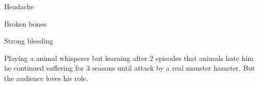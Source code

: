 \begin{npcBox}[title=Theophil Tierlieb]

    \begin{aspects}
    \item {}
    \item {}
    \item {}
    \end{aspects}

    \begin{skills}
    \item {}
    \item {}
    \item {}
    \item {}
    \item {}
    \item {}
    \item {}
    \item {}
    \item {}
    \item {}
    \item {}
    \item {}
    \item {}
    \item {}
    \item {}
    \item {}
    \item {}
    \item {}
    \item {}
    \end{skills}

    \begin{stressSection}
    \end{stressSection}
    \begin{tabularx}{\textwidth}{ XX }
    \end{tabularx}

    \begin{consequences}
    \item {} Headache
    \item {} Broken bones
    \item {} Strong bleeding
    \end{consequences}

    \begin{npcDescription}
    Playing a animal whisperer but learning after 2 episodes that animals hate him he continued suffering for 3 seasons until attack by a real monster hamster. But the audience loves his role.
    \end{npcDescription}

\end{npcBox}


